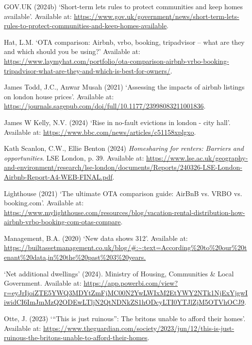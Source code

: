 \documentclass[
  a4paper,
  DIV=11,
  numbers=noendperiod]{scrartcl}
\newlength{\cslhangindent}
\newenvironment{CSLReferences}[2] %
 {\begin{list}{}{%
  \setlength{\itemindent}{0pt}
  \setlength{\leftmargin}{0pt}
  \setlength{\parsep}{0pt}
  \ifodd #1
   \setlength{\leftmargin}{\cslhangindent}
   \setlength{\itemindent}{-1\cslhangindent}
  \fi
  \setlength{\itemsep}{#2\baselineskip}}}
 {\end{list}}
\begin{document}
\begin{CSLReferences}{0}{1}
GOV.UK (2024b) {`Short-term lets rules to protect communities and keep
homes available'}. Available at:
\url{https://www.gov.uk/government/news/short-term-lets-rules-to-protect-communities-and-keep-homes-available}.

Hat, L.M. {`OTA comparison: Airbnb, vrbo, booking, tripadvisor -- what
are they and which should you be using?'} Available at:
\url{https://www.laymyhat.com/portfolio/ota-comparison-airbnb-vrbo-booking-tripadvisor-what-are-they-and-which-is-best-for-owners/}.

James Todd, J.C., Anwar Musah (2021) {`Assessing the impacts of airbnb
listings on london house prices'}. Available at:
\url{https://journals.sagepub.com/doi/full/10.1177/23998083211001836}.

James W Kelly, N.V. (2024) {`Rise in no-fault evictions in london - city
hall'}. Available at:
\url{https://www.bbc.com/news/articles/c51158xplgxo}.

Kath Scanlon, C.W., Ellie Benton (2024) \emph{Homesharing for renters:
Barriers and opportunities}. LSE London, p. 39. Available at:
\url{https://www.lse.ac.uk/geography-and-environment/research/lse-london/documents/Reports/240326-LSE-London-Airbnb-Report-A4-WEB-FINAL.pdf}.

Lighthouse (2021) {`The ultimate OTA comparison guide: AirBnB vs. VRBO
vs. booking.com'}. Available at:
\url{https://www.mylighthouse.com/resources/blog/vacation-rental-distribution-how-airbnb-vrbo-booking-com-otas-compare}.

Management, B.A. (2020) {`New data shows 312'}. Available at:
\url{https://builtassetmanagement.co.uk/blog/\#:~:text=According\%20to\%20our\%20tenant\%20data,in\%20the\%20past\%203\%20years.}

{`Net additional dwellings'} (2024). Ministry of Housing, Communities \&
Local Government. Available at:
\url{https://app.powerbi.com/view?r=eyJrIjoiZTE5YWQ3MDYtZmFjMC00N2YwLWIxM2EtYWY2NTk1NjExYjgwIiwidCI6ImJmMzQ2ODEwLTljN2QtNDNkZS1hODcyLTI0YTJlZjM5OTVhOCJ9}.

Otte, J. (2023) {`{``This is just ruinous''}: The britons unable to
afford their homes'}. Available at:
\url{https://www.theguardian.com/society/2023/jun/12/this-is-just-ruinous-the-britons-unable-to-afford-their-homes}.


\end{CSLReferences}
\end{document}
